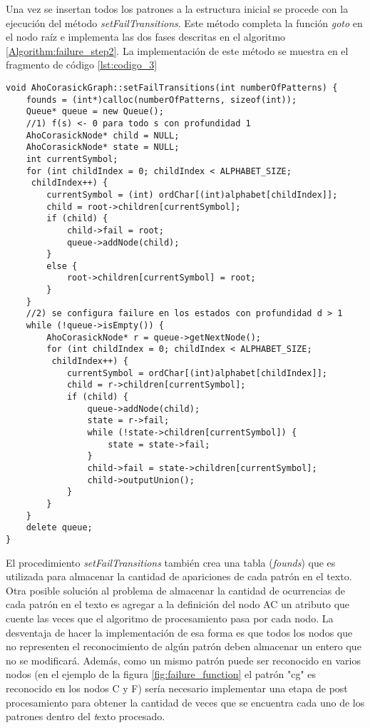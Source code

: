 {Una vez se insertan todos los patrones a la estructura inicial se procede con la ejecución del método {\it setFailTransitions}. Este método completa la función {\it goto} en el nodo raíz e implementa las dos fases descritas en el algoritmo {\ref{Algorithm:failure_step2}}.
La implementación de este método se muestra en el fragmento de código {\ref{lst:codigo_3}}
\begin{lstlisting}[caption=Creación de la función failure, label={lst:codigo_3}]
void AhoCorasickGraph::setFailTransitions(int numberOfPatterns) {
    founds = (int*)calloc(numberOfPatterns, sizeof(int));
	Queue* queue = new Queue();
	//1) f(s) <- 0 para todo s con profundidad 1
	AhoCorasickNode* child = NULL;
	AhoCorasickNode* state = NULL;
	int currentSymbol;
	for (int childIndex = 0; childIndex < ALPHABET_SIZE;
	 childIndex++) {
		currentSymbol = (int) ordChar[(int)alphabet[childIndex]];
		child = root->children[currentSymbol];
		if (child) {
			child->fail = root;
			queue->addNode(child);
		}
		else {
			root->children[currentSymbol] = root;
		}
	}
	//2) se configura failure en los estados con profundidad d > 1
	while (!queue->isEmpty()) {
		AhoCorasickNode* r = queue->getNextNode();
		for (int childIndex = 0; childIndex < ALPHABET_SIZE;
		 childIndex++) {
			currentSymbol = ordChar[(int)alphabet[childIndex]];
			child = r->children[currentSymbol];
			if (child) {
				queue->addNode(child);
				state = r->fail;
				while (!state->children[currentSymbol]) {
					state = state->fail;
				}
				child->fail = state->children[currentSymbol];
				child->outputUnion();
			}
		}
	}
	delete queue;
}
\end{lstlisting}
El procedimiento {\it setFailTransitions} también crea una tabla ({\it founds}) que es utilizada para almacenar la cantidad de apariciones de cada patrón en el texto. Otra posible solución al problema de almacenar la cantidad de ocurrencias de cada patrón en el texto es agregar a la definición del nodo AC un atributo que cuente las veces que el algoritmo de procesamiento pasa por cada nodo. La desventaja de hacer la implementación de esa forma es que todos los nodos que no representen el reconocimiento de algún patrón deben almacenar un entero que no se modificará. Además, como un mismo patrón puede ser reconocido en varios nodos (en el ejemplo de la figura \ref{fig:failure_function} el patrón "cg" es reconocido en los nodos C y F) sería necesario implementar una etapa de post procesamiento para obtener la cantidad de veces que se encuentra cada uno de los patrones dentro del {\emph texto} procesado.\\
}
